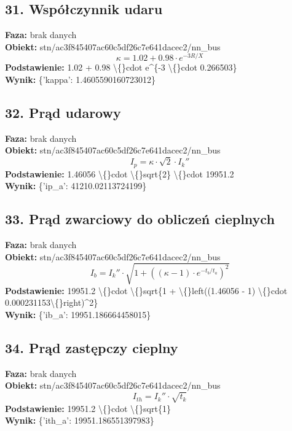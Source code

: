 ﻿\documentclass[11pt]{article}
\begin{document}
\subsection*{31. Współczynnik udaru}
\textbf{Faza:} brak danych\\
\textbf{Obiekt:} stn/ac3f845407ac60c5df26c7e641dacec2/nn\_bus\\
\[
\kappa = 1.02 + 0.98 \cdot e^{-3 R/X}
\]
\textbf{Podstawienie:} 1.02 + 0.98 \textbackslash\{\}cdot e\textasciicircum{}\{-3 \textbackslash\{\}cdot 0.266503\}\\
\textbf{Wynik:} \{'kappa': 1.4605590160723012\}\\
\subsection*{32. Prąd udarowy}
\textbf{Faza:} brak danych\\
\textbf{Obiekt:} stn/ac3f845407ac60c5df26c7e641dacec2/nn\_bus\\
\[
I_p = \kappa \cdot \sqrt{2} \cdot I_{k}''
\]
\textbf{Podstawienie:} 1.46056 \textbackslash\{\}cdot \textbackslash\{\}sqrt\{2\} \textbackslash\{\}cdot 19951.2\\
\textbf{Wynik:} \{'ip\_a': 41210.02113724199\}\\
\subsection*{33. Prąd zwarciowy do obliczeń cieplnych}
\textbf{Faza:} brak danych\\
\textbf{Obiekt:} stn/ac3f845407ac60c5df26c7e641dacec2/nn\_bus\\
\[
I_b = I_{k}'' \cdot \sqrt{1 + ((\kappa - 1) \cdot e^{-t_b/t_a})^2}
\]
\textbf{Podstawienie:} 19951.2 \textbackslash\{\}cdot \textbackslash\{\}sqrt\{1 + \textbackslash\{\}left((1.46056 - 1) \textbackslash\{\}cdot 0.000231153\textbackslash\{\}right)\textasciicircum{}2\}\\
\textbf{Wynik:} \{'ib\_a': 19951.186664458015\}\\
\subsection*{34. Prąd zastępczy cieplny}
\textbf{Faza:} brak danych\\
\textbf{Obiekt:} stn/ac3f845407ac60c5df26c7e641dacec2/nn\_bus\\
\[
I_{th} = I_{k}'' \cdot \sqrt{t_k}
\]
\textbf{Podstawienie:} 19951.2 \textbackslash\{\}cdot \textbackslash\{\}sqrt\{1\}\\
\textbf{Wynik:} \{'ith\_a': 19951.186551397983\}\\
\end{document}
